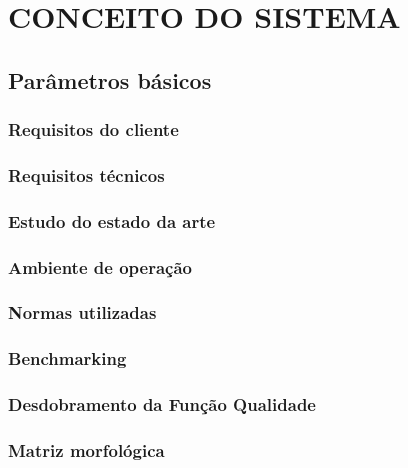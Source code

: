 \chapter{CONCEITO DO SISTEMA}
\label{chap:conce}

\section{Parâmetros básicos}
\label{sec:basi}


\subsection{Requisitos do cliente}
\label{sub:reqc}


\subsection{Requisitos técnicos}
\label{sub:reqt}


\subsection{Estudo do estado da arte}
\label{sub:sota}


\subsection{Ambiente de operação}
\label{sub:ambiente}


\subsection{Normas utilizadas}
\label{sub:normas}


\subsection{Benchmarking}
\label{sub:bench}


\subsection{Desdobramento da Função Qualidade}
\label{sub:qfd}


\subsection{Matriz morfológica}
\label{sub:matmorf}


